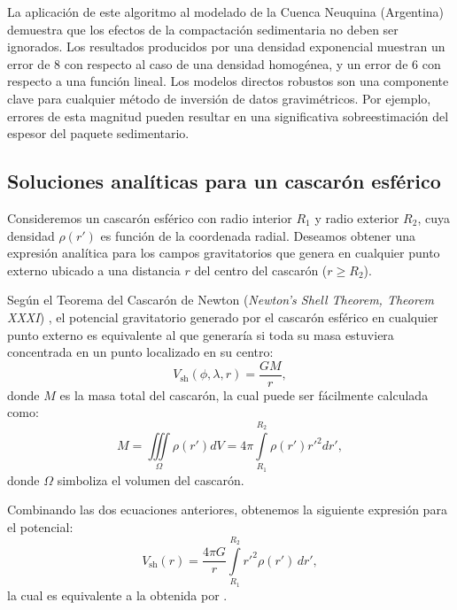 La aplicación de este algoritmo al modelado de la Cuenca Neuquina (Argentina)
demuestra que los efectos de la compactación sedimentaria no deben ser
ignorados.
Los resultados producidos por una densidad exponencial muestran un error de
8\mGal{} con respecto al caso de una densidad homogénea, y un error de 6\mGal{}
con respecto a una función lineal.
Los modelos directos robustos son una componente clave para cualquier método de
inversión de datos gravimétricos.
Por ejemplo, errores de esta magnitud pueden resultar en una significativa
sobreestimación del espesor del paquete sedimentario.



\begin{subappendices}

\section{Soluciones analíticas para un cascarón esférico}
\label{sec:shell}

Consideremos un cascarón esférico con radio interior $R_1$ y radio exterior
$R_2$, cuya densidad $\rho(r')$ es función de la coordenada radial.
Deseamos obtener una expresión analítica para los campos gravitatorios que
genera en cualquier punto externo ubicado a una distancia $r$ del centro del
cascarón ($r \geq R_2$).

Según el Teorema del Cascarón de Newton (\emph{Newton's Shell Theorem, Theorem
XXXI}) \citep{chandrasekhar1995, binney2008}, el potencial gravitatorio
generado por el cascarón esférico en cualquier punto externo es equivalente
al que generaría si toda su masa estuviera concentrada en un punto localizado
en su centro:
%
\begin{equation}
    V_\text{sh}(\phi, \lambda, r) = \frac{GM}{r},
\end{equation}
%
donde $M$ es la masa total del cascarón, la cual puede ser fácilmente
calculada como:
%
\begin{equation}
    M =
    \iiint\limits_{\Omega} \rho(r') dV =
    4\pi \int\limits_{R_1}^{R_2} \rho(r') {r'}^2 dr',
\end{equation}
%
donde $\Omega$ simboliza el volumen del cascarón.

Combinando las dos ecuaciones anteriores, obtenemos la siguiente expresión para
el potencial:
%
\begin{equation}
    V_\text{sh}(r) = \frac{4\pi G}{r}
    \int\limits_{R_1}^{R_2} {r'}^2 \rho(r') \, dr',
\label{eq:shell-pot}
\end{equation}
%
la cual es equivalente a la obtenida por \citet[p.62]{binney2008}.


\end{subappendices}

